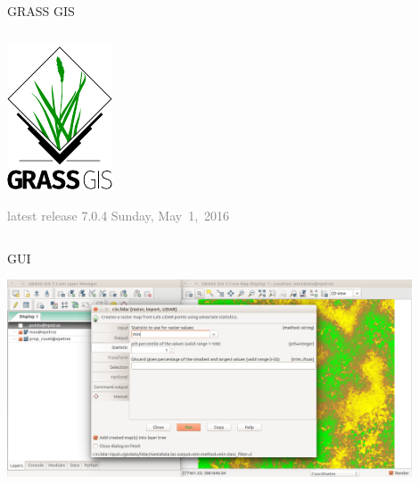 \documentclass[xcolor={dvipsnames,usenames},beamer,aspectratio=43]{beamer}
\begin{document}
\begin{frame}{GRASS GIS}
\begin{columns}
\begin{column}{0.3\textwidth}
\begin{center}
  \includegraphics[width=\textwidth]{logos/grass_gis}
\end{center}

\textcolor{gray}{
\footnotesize
latest release 7.0.4 Sunday, May~1,~2016
}

\end{column}
\end{columns}

\end{frame}


\begin{frame}{GUI}

\begin{center}
  \includegraphics[width=0.9\textwidth]{grass/r_in_lidar_gui}
\end{center}

\end{frame}
\end{document}
